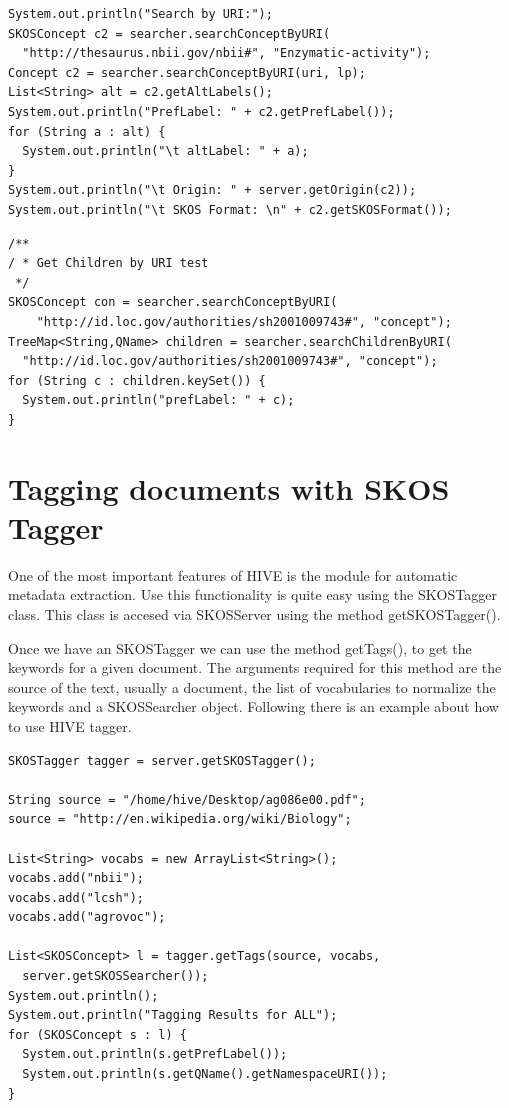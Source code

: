 \begin{verbatim}
System.out.println("Search by URI:");
SKOSConcept c2 = searcher.searchConceptByURI(
  "http://thesaurus.nbii.gov/nbii#", "Enzymatic-activity");
Concept c2 = searcher.searchConceptByURI(uri, lp);
List<String> alt = c2.getAltLabels();
System.out.println("PrefLabel: " + c2.getPrefLabel());
for (String a : alt) {
  System.out.println("\t altLabel: " + a);
}
System.out.println("\t Origin: " + server.getOrigin(c2));
System.out.println("\t SKOS Format: \n" + c2.getSKOSFormat());
\end{verbatim}

\begin{verbatim}
/**
/ * Get Children by URI test
 */
SKOSConcept con = searcher.searchConceptByURI(
    "http://id.loc.gov/authorities/sh2001009743#", "concept");
TreeMap<String,QName> children = searcher.searchChildrenByURI(
  "http://id.loc.gov/authorities/sh2001009743#", "concept");
for (String c : children.keySet()) {
  System.out.println("prefLabel: " + c);
}
\end{verbatim}


\section{Tagging documents with SKOS Tagger}

One of the most important features of HIVE is the module for automatic metadata extraction. Use this functionality is quite easy using the SKOSTagger class. 
This class is accesed via SKOSServer using the method getSKOSTagger().

Once we have an SKOSTagger we can use the method getTags(), to get the keywords for a given document. The arguments required for this method are the source 
of the text, usually a document, the list of vocabularies to normalize the keywords and a SKOSSearcher object. Following there is an example about how to use HIVE tagger.

\begin{verbatim}
SKOSTagger tagger = server.getSKOSTagger();

String source = "/home/hive/Desktop/ag086e00.pdf";
source = "http://en.wikipedia.org/wiki/Biology";

List<String> vocabs = new ArrayList<String>();
vocabs.add("nbii");
vocabs.add("lcsh");
vocabs.add("agrovoc");

List<SKOSConcept> l = tagger.getTags(source, vocabs,
  server.getSKOSSearcher());
System.out.println();
System.out.println("Tagging Results for ALL");
for (SKOSConcept s : l) {
  System.out.println(s.getPrefLabel());
  System.out.println(s.getQName().getNamespaceURI());
}
\end{verbatim}
